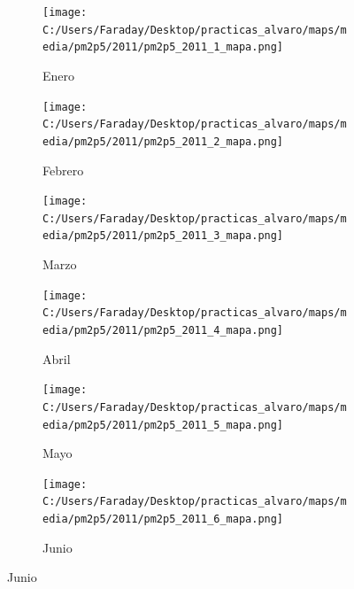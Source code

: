 \documentclass[12pt]{article}
\begin{document}
\begin{figure}[H]
\centering
\begin{subfigure}[H]{0.15\textwidth}
\texttt{[image: C:/Users/Faraday/Desktop/practicas\_alvaro/maps/media/pm2p5/2011/pm2p5\_2011\_1\_mapa.png]}
\captionsetup{labelformat=empty}
\caption{Enero}
\label{fig:map-pm2p5-2011-1}
\end{subfigure}
%
\begin{subfigure}[H]{0.15\textwidth}
\texttt{[image: C:/Users/Faraday/Desktop/practicas\_alvaro/maps/media/pm2p5/2011/pm2p5\_2011\_2\_mapa.png]}
\captionsetup{labelformat=empty}
\caption{Febrero}
\label{fig:map-pm2p5-2011-2}
\end{subfigure}
%
\begin{subfigure}[H]{0.15\textwidth}
\texttt{[image: C:/Users/Faraday/Desktop/practicas\_alvaro/maps/media/pm2p5/2011/pm2p5\_2011\_3\_mapa.png]}
\captionsetup{labelformat=empty}
\caption{Marzo}
\label{fig:map-pm2p5-2011-3}
\end{subfigure}
%
\begin{subfigure}[H]{0.15\textwidth}
\texttt{[image: C:/Users/Faraday/Desktop/practicas\_alvaro/maps/media/pm2p5/2011/pm2p5\_2011\_4\_mapa.png]}
\captionsetup{labelformat=empty}
\caption{Abril}
\label{fig:map-pm2p5-2011-4}
\end{subfigure}
%
\begin{subfigure}[H]{0.15\textwidth}
\texttt{[image: C:/Users/Faraday/Desktop/practicas\_alvaro/maps/media/pm2p5/2011/pm2p5\_2011\_5\_mapa.png]}
\captionsetup{labelformat=empty}
\caption{Mayo}
\label{fig:map-pm2p5-2011-5}
\end{subfigure}
%
\begin{subfigure}[H]{0.15\textwidth}
\texttt{[image: C:/Users/Faraday/Desktop/practicas\_alvaro/maps/media/pm2p5/2011/pm2p5\_2011\_6\_mapa.png]}
\captionsetup{labelformat=empty}
\caption{Junio}
\label{fig:map-pm2p5-2011-6}
\end{subfigure}


\end{figure}
\end{document}
